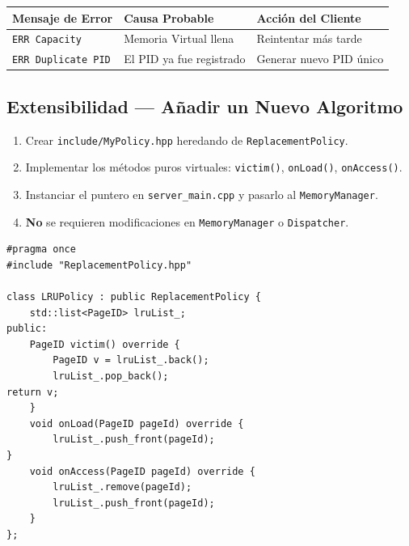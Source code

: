 \documentclass[12pt,letterpaper]{article}
\begin{document}
\begin{table}[H]
\centering
{}
\begin{tabular}{@{}lll@{}}
\toprule
\rowcolor{catBlue!40}
\textbf{Mensaje de Error} & \textbf{Causa Probable} & \textbf{Acción del Cliente} \\ \midrule
\texttt{ERR Capacity} & Memoria Virtual llena & Reintentar más tarde \\
\texttt{ERR Duplicate PID} & El PID ya fue registrado & Generar nuevo PID único \\ \bottomrule
\end{tabular}
\end{table}

\subsection{Extensibilidad --- Añadir un Nuevo Algoritmo}

\begin{tcolorbox}[infobox, title={Guía Paso a Paso para Nuevas Políticas}]
\begin{enumerate}
    \item Crear \texttt{include/MyPolicy.hpp} heredando de \texttt{ReplacementPolicy}.
\item Implementar los métodos puros virtuales: \texttt{victim()}, \texttt{onLoad()}, \texttt{onAccess()}.
    \item Instanciar el puntero en \texttt{server\_main.cpp} y pasarlo al \texttt{MemoryManager}.
\item \textbf{No} se requieren modificaciones en \texttt{MemoryManager} o \texttt{Dispatcher}.
\end{enumerate}
\end{tcolorbox}

\begin{tcolorbox}[codebox, title={Esqueleto de Implementación}]
\begin{lstlisting}
#pragma once
#include "ReplacementPolicy.hpp"

class LRUPolicy : public ReplacementPolicy {
    std::list<PageID> lruList_;
public:
    PageID victim() override {
        PageID v = lruList_.back();
        lruList_.pop_back();
return v;
    }
    void onLoad(PageID pageId) override {
        lruList_.push_front(pageId);
}
    void onAccess(PageID pageId) override {
        lruList_.remove(pageId);
        lruList_.push_front(pageId);
    }
};
\end{lstlisting}
\end{tcolorbox}
\end{document}
